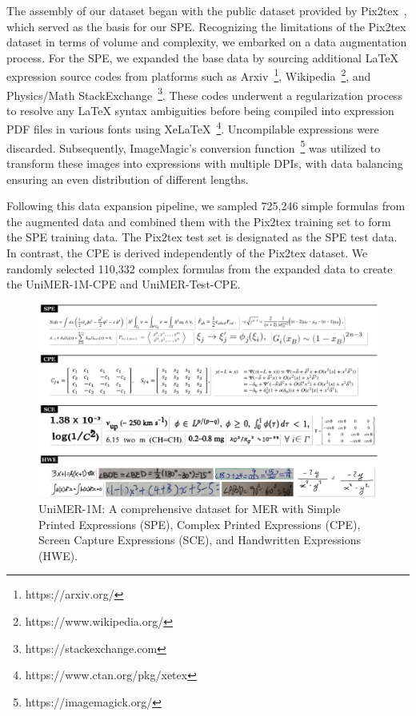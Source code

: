 \documentclass[runningheads]{llncs}
\begin{document}
The assembly of our dataset began with the public dataset provided by Pix2tex~\cite{pix2tex2022}, which served as the basis for our SPE. Recognizing the limitations of the Pix2tex dataset in terms of volume and complexity, we embarked on a data augmentation process. For the SPE, we expanded the base data by sourcing additional LaTeX expression source codes from platforms such as Arxiv~\footnote{https://arxiv.org/}, Wikipedia~\footnote{https://www.wikipedia.org/}, and Physics/Math StackExchange~\footnote{https://stackexchange.com}. These codes underwent a regularization process \cite{deng2017image} to resolve any LaTeX syntax ambiguities before being compiled into expression PDF files in various fonts using XeLaTeX~\footnote{https://www.ctan.org/pkg/xetex}. Uncompilable expressions were discarded. Subsequently, ImageMagic's conversion function~\footnote{https://imagemagick.org/} was utilized to transform these images into expressions with multiple DPIs, with data balancing ensuring an even distribution of different lengths.

Following this data expansion pipeline, we sampled 725,246 simple formulas from the augmented data and combined them with the Pix2tex training set to form the SPE training data. The Pix2tex test set is designated as the SPE test data. In contrast, the CPE is derived independently of the Pix2tex dataset. We randomly selected 110,332 complex formulas from the expanded data to create the UniMER-1M-CPE and UniMER-Test-CPE.


\begin{figure}[t]
  \centering
	\includegraphics[width=0.95 \linewidth]{figures/fig2_unimernet_data.pdf}
    \caption{UniMER-1M: A comprehensive dataset for MER with Simple Printed Expressions (SPE), Complex Printed Expressions (CPE), Screen Capture Expressions (SCE), and Handwritten Expressions (HWE).}
  \label{fig:fig2_example}
\end{figure}
\end{document}
